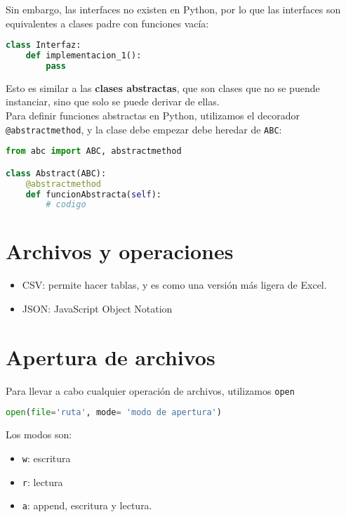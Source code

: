 \documentclass{./Programacion.tex}
\begin{document}
Sin embargo, las interfaces no existen en Python, por lo que las interfaces son equivalentes a clases padre con funciones vacía:
\begin{lstlisting}[language=python]
class Interfaz:
	def implementacion_1():
		pass
\end{lstlisting}
Esto es similar a las \textbf{clases abstractas}, que son clases que no se puende instanciar, sino que solo se puede derivar de ellas.\\
Para definir funciones abstractas en Python, utilizamos el decorador \verb|@abstractmethod|, y la clase debe empezar debe heredar de \verb|ABC|:
\begin{lstlisting}[language=python]
from abc import ABC, abstractmethod

class Abstract(ABC):
	@abstractmethod
	def funcionAbstracta(self):
		# codigo
\end{lstlisting}
\section{Archivos y operaciones}
\begin{itemize}
  \item CSV: permite hacer tablas, y es como una versión más ligera de Excel.
  \item JSON: JavaScript Object Notation
\end{itemize}
\section{Apertura de archivos}
Para llevar a cabo cualquier operación de archivos, utilizamos \verb|open|
\begin{lstlisting}[language=python]
open(file='ruta', mode= 'modo de apertura')
\end{lstlisting}
Los modos son:
\begin{itemize}
  \item \verb|w|: escritura
\item \verb|r|: lectura
\item \verb|a|: append, escritura y lectura.
\end{itemize}
\end{document}
